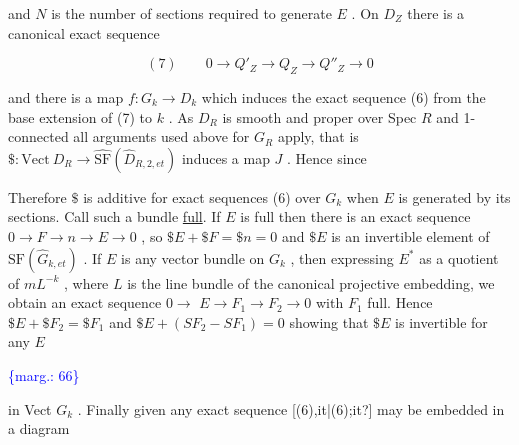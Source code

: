 \documentclass[11pt]{article}
\newcommand{\scanpage}[1]{\par\bigskip\noindent{\small\sffamily[scan #1]}\par}
\newcommand{\mspage}[1]{{\small\sffamily[p.\,#1]}}
\newcommand{\margin}[1]{\textcolor{blue}{\{\textsf{marg.:} #1\}}}
\newcommand{\uline}[1]{\underline{#1}}
\newcommand{\unsure}[1]{[#1?]}
\newenvironment{diagramblock}{\par\begin{center}}{\end{center}\par}
\begin{document}
and $N$ is the number of sections required to generate $E$ . On
$D_Z$ there is a canonical exact sequence

\[ (7) \qquad 0 \to Q'_Z \to Q_Z \to Q''_Z \to 0 \]

and there is a map $f:G_k \to D_k$ which induces the exact sequence
(6) from the base extension of (7) to $k$ . As $D_R$ is smooth and
proper over Spec $R$ and 1-connected all arguments used above for
$G_R$ apply, that is $\$:\mathrm{Vect}\ D_R \to \hat{\mathrm{SF}}(\hat{D}_{R,2,et})$ induces a map $J$ .
Hence since

\begin{diagramblock}
\end{diagramblock}

Therefore $\$$ is additive for exact sequences (6) over $G_k$
when $E$ is generated by its sections. Call such a bundle \uline{full}.
If $E$ is full then there is an exact sequence $0 \to F \to n \to E \to 0$ ,
so $\$E + \$F = \$n = 0$ and $\$E$ is an invertible element of
$\mathrm{SF}(\hat{G}_{k,et})$ . If $E$ is any vector bundle on $G_k$ , then expressing
$E^*$ as a quotient of $mL^{-k}$ , where $L$ is the line bundle of the
canonical projective embedding, we obtain an exact sequence $0 \to$
$E \to F_1 \to F_2 \to 0$ with $F_1$ full. Hence $\$E + \$F_2 = \$F_1$ and
$\$E + (SF_2 - SF_1) = 0$ showing that $\$E$ is invertible for any $E$

\margin{66}

\clearpage
\scanpage{162-5/67}
\mspage{- 11 -}

in Vect $G_k$ . Finally given any exact sequence \unsure{(6),it|(6);it} may be
embedded in a diagram

\begin{diagramblock}
\end{diagramblock}
\end{document}
